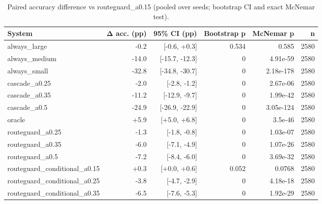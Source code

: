 \begin{table}[t]
\centering
\small
\caption{Paired accuracy difference vs routeguard\_a0.15 (pooled over seeds; bootstrap CI and exact McNemar test).}
\label{tab:significance}
\begin{tabular}{lrrrrr}
\toprule
System & Δ acc. (pp) & 95\% CI (pp) & Bootstrap p & McNemar p & n \\
\midrule
always\_large & -0.2 & [-0.6, +0.3] & 0.534 & 0.585 & 2580 \\
always\_medium & -14.0 & [-15.7, -12.3] & 0 & 4.91e-59 & 2580 \\
always\_small & -32.8 & [-34.8, -30.7] & 0 & 2.18e-178 & 2580 \\
cascade\_a0.25 & -2.0 & [-2.8, -1.2] & 0 & 2.67e-06 & 2580 \\
cascade\_a0.35 & -11.2 & [-12.9, -9.7] & 0 & 1.99e-42 & 2580 \\
cascade\_a0.5 & -24.9 & [-26.9, -22.9] & 0 & 3.05e-124 & 2580 \\
oracle & +5.9 & [+5.0, +6.8] & 0 & 3.5e-46 & 2580 \\
routeguard\_a0.25 & -1.3 & [-1.8, -0.8] & 0 & 1.03e-07 & 2580 \\
routeguard\_a0.35 & -6.0 & [-7.1, -4.9] & 0 & 1.07e-26 & 2580 \\
routeguard\_a0.5 & -7.2 & [-8.4, -6.0] & 0 & 3.69e-32 & 2580 \\
routeguard\_conditional\_a0.15 & +0.3 & [+0.0, +0.6] & 0.052 & 0.0768 & 2580 \\
routeguard\_conditional\_a0.25 & -3.8 & [-4.7, -2.9] & 0 & 4.18e-18 & 2580 \\
routeguard\_conditional\_a0.35 & -6.5 & [-7.6, -5.3] & 0 & 1.92e-29 & 2580 \\
\bottomrule
\end{tabular}
\end{table}

